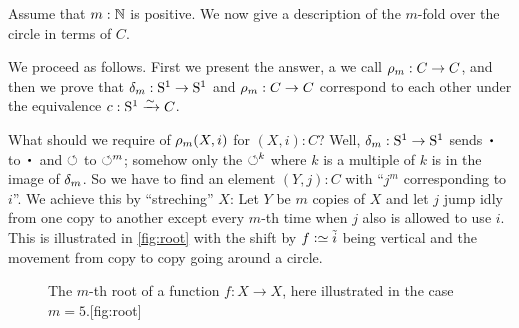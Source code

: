 \begin{example}\label{exa:mfoldCcover}
Assume that $m:\mathbb{N}$ is positive.  We now give a description of
the $m$-fold \covering over the circle in terms of $C$.

We proceed as follows.
First we present the answer, a \covering we call $\cdg{m}:C\to C$,
and then we prove that $\dg{m}:\Sc\to\Sc$ and $\cdg{m}:C\to C$
correspond to each other under the equivalence $c:{\mathrm{S}^1}\xrightarrow{\sim} C$.

What should we require of $\cdg{m}(X,i)$ for $(X,i):C$?
Well, $\dg{m}:\Sc\to\Sc$ sends $\base$ to $\base$ and $\circlearrowleft$ to $\circlearrowleft^m$;
somehow only the $\circlearrowleft^k$ where $k$ is a multiple of $k$ is in the image of $\dg{m}$.
So we have to find an element $(Y,j):C$ with ``$j^m$ corresponding to $i$''.
We achieve this by ``streching'' $X$:
Let $Y$ be $m$ copies of $X$ and let $j$ jump idly from one copy to another except every $m$-th time when $j$ also is allowed to use $i$.
This is illustrated in \cref{fig:root} with the shift by $f\defeq\ptoe{i}$ being
vertical and the movement from copy to copy going around a circle.
\begin{figure}[hbt]
  \begin{sidecaption}%
    {The $m$-th root of a function $f: X\to X$,
    here illustrated in the case $m=5$.}[fig:root]
  \centering
  \end{sidecaption}
\end{figure}


\end{example}
